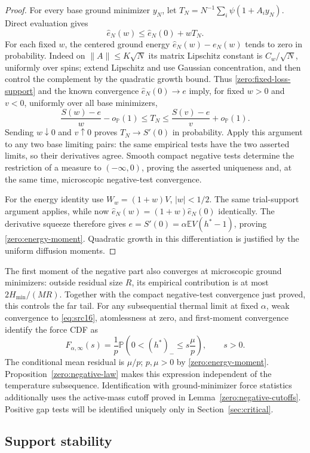 \documentclass[11pt,a4paper]{article}
\numberwithin{equation}{section}
\theoremstyle{definition}
\theoremstyle{remark}
\newcommand{\E}{\mathbb E}
\newcommand{\Prob}{\mathbb P}
\begin{document}
\begin{proof}
For every base ground minimizer \(y_N\), let
\(T_N=N^{-1}\sum_i\psi(1+A_i y_N)\).  Direct evaluation gives
\[
 \widehat e_N(w)\le\widehat e_N(0)+wT_N.
\]
For each fixed \(w\), the centered ground energy
\(\widehat e_N(w)-e_N(w)\) tends to zero in probability.
Indeed on \(\|A\|\le K\sqrt N\) its matrix Lipschitz constant is
\(C_w/\sqrt N\), uniformly over spins; extend Lipschitz and use
Gaussian concentration, and then control the complement by the
quadratic growth bound.  Thus \eqref{zero:fixed-loss-support} and
the known convergence \(\widehat e_N(0)\to e\) imply, for fixed
\(w>0\) and \(v<0\), uniformly over all base minimizers,
\[
 \frac{S(w)-e}{w}-o_{\Prob}(1)
 \le T_N\le
 \frac{S(v)-e}{v}+o_{\Prob}(1).
\]
Sending \(w\downarrow0\) and \(v\uparrow0\) proves
\(T_N\to S'(0)\) in probability.  Apply this argument to any two
base limiting pairs: the same empirical tests have the two asserted
limits, so their derivatives agree.  Smooth compact negative tests
determine the restriction of a measure to \((-\infty,0)\), proving
the asserted uniqueness and, at the same time, microscopic
negative-test convergence.

For the energy identity use \(W_w=(1+w)V\), \(|w|<1/2\).
The same trial-support argument applies, while now
\(\widehat e_N(w)=(1+w)\widehat e_N(0)\) identically.
The derivative squeeze therefore gives
\(e=S'(0)=\alpha\E V(h^*-1)\), proving
\eqref{zero:energy-moment}.  Quadratic growth in this differentiation
is justified by the uniform diffusion moments.
\end{proof}

The first moment of the negative part also converges at microscopic
ground minimizers: outside residual size \(R\), its empirical
contribution is at most \(2H_{\min}/(MR)\).  Together with the compact
negative-test convergence just proved, this controls the far tail.
For any subsequential thermal limit at fixed \(\alpha\), weak
convergence to \eqref{eq:src16}, atomlessness at zero, and first-moment
convergence identify the force CDF as
\[
 F_{\alpha,\infty}(s)
 =\frac1p\Prob\left(0<(h^*)_-\le s\frac\mu p\right),\qquad s>0.
\]
The conditional mean residual is $\mu/p$; $p,\mu>0$ by
\eqref{zero:energy-moment}.  Proposition~\ref{zero:negative-law} makes
this expression independent of the temperature subsequence.  Identification with ground-minimizer
force statistics additionally uses the active-mass cutoff proved in
Lemma~\ref{zero:negative-cutoffs}.  Positive gap tests will be identified
uniquely only in Section~\ref{sec:critical}.

\subsection{Support stability}
\end{document}

